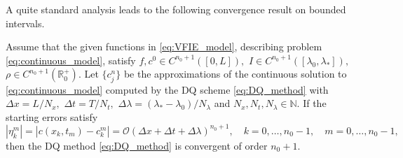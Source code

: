 \documentclass[a4paper, UKenglish, numberwithinsect, thm-restate]{tgdk-v2021}
\begin{document}
A quite standard analysis leads to the following convergence result on bounded intervals.
\begin{theorem}\label{thm:DQ_Convergence}
    Assume that the given functions in \eqref{eq:VFIE_model}, describing problem \eqref{eq:continuous_model}, satisfy $f,c^0\in C^{n_0+1}([0,L]),$ $I\in C^{n_0+1}([\lambda_{0},\lambda_{*}]),$ $\rho\in C^{n_0+1}(\mathbb{R}^+_0).$ Let $\{c^n_j\}$ be the approximations of the continuous solution to \eqref{eq:continuous_model} computed by the DQ scheme \eqref{eq:DQ_method} with $\Delta x=L/N_x,$ $\Delta t=T/N_t,$ $\Delta \lambda=(\lambda_{*}-\lambda_{0})/N_\lambda$ and $N_x,N_t,N_\lambda\in \mathbb{N}.$ 
    If the starting errors satisfy
    \begin{equation}\label{eq:starting_errors}
        |\eta_k^m|=|c(x_k,t_m)-c^m_k|=\mathcal{O}(\Delta x+\Delta t+\Delta \lambda)^{n_0+1}, \quad k=0,\dots,n_0-1, \quad m=0,\dots,n_0-1,
    \end{equation}
    then the DQ method \eqref{eq:DQ_method} is convergent of order $n_0+1.$
\end{theorem}
\end{document}
